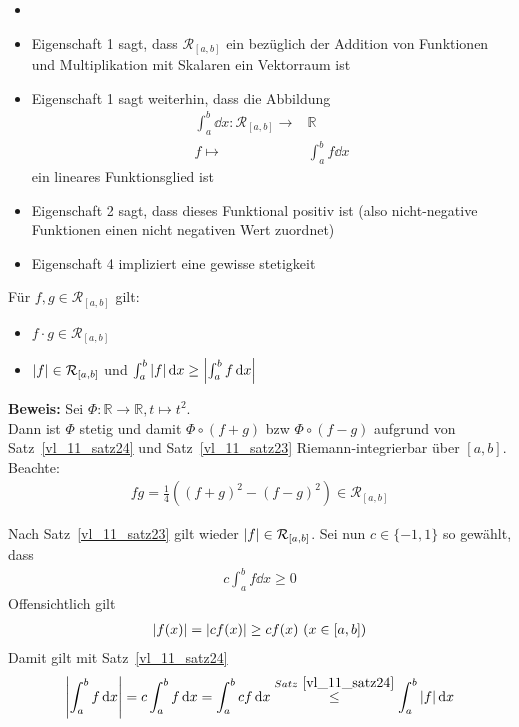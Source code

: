 \begin{Bemerkung}{
	\begin{itemize}
	 	\item[ ]
		\item Eigenschaft 1 sagt, dass $\mathcal{R}_{[a,b]}$ ein bezüglich der Addition von 
		Funktionen und Multiplikation mit Skalaren ein Vektorraum ist
		\item Eigenschaft 1 sagt weiterhin, dass die Abbildung 
		\begin{align*}
			\int_a^b \dd{x} : \mathcal{R}_{[a,b]} \rightarrow  & \mathbb{R} \\
			f \mapsto & \int_a^b f\dd{x}
		\end{align*}
		ein lineares Funktionsglied ist
		\item Eigenschaft 2 sagt, dass dieses Funktional positiv ist
		(also nicht-negative Funktionen einen nicht negativen Wert zuordnet)
		\item Eigenschaft 4 impliziert eine gewisse stetigkeit
	\end{itemize}
}\end{Bemerkung}

\begin{Satz}{
	Für $f,g \in \mathcal{R}_{[a,b]}$ gilt:
	\begin{itemize}
		\item $f \cdot g \in \mathcal{R}_{[a,b]}$
		\item $\abs{f} \in \mathcal{R}_{[a,b]}$ und $\int_a^b \abs{f} \dd{x} 
		\geq \abs{\int_a^b f \dd{x}}$
	\end{itemize}
	\textbf{Beweis:}
	Sei $\Phi : \mathbb{R} \rightarrow  \mathbb{R}, t \mapsto t^2$. \\
	Dann ist
	$\Phi$ stetig und damit $\Phi \circ (f+g) $ bzw $\Phi \circ (f -g)$ 
	aufgrund von Satz~\ref{vl_11_satz24} und Satz~\ref{vl_11_satz23}
	Riemann-integrierbar über $[a,b]$.
	Beachte: 
	\begin{align*}
		f g = \frac{1}{4} ((f + g)^2 - (f-g)^2) \in \mathcal{R}_{[a,b]}
	\end{align*}
	\item Nach Satz~\ref{vl_11_satz23}
	gilt wieder $\abs{f} \in \mathcal{R}_{[a,b]}$. Sei nun $c \in \{-1, 1\}$ so 
	gewählt, dass 
	\begin{align*}
		c \int_a^b f \dd{x} \geq 0
	\end{align*}
	Offensichtlich gilt 
	\begin{align*}
		\abs{f(x)} = \abs{c f(x)} \geq c f(x) \text{ } (x \in [a,b])
	\end{align*}
	Damit gilt mit Satz~\ref{vl_11_satz24}
	\begin{align*}
		\abs{\int_a^b f\dd{x}} = c \int_a^b f\dd{x} = \int_a^b cf \dd{x} 
		\overset{Satz~\ref{vl_11_satz24}}{\le} \int_a^b \abs{f}\dd{x}
	\end{align*}
}\end{Satz}

